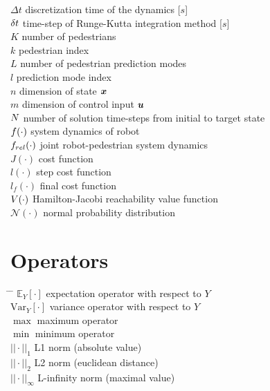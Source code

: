 \begin{tabbing}
$\Delta t$ \> discretization time of the dynamics [$s$] \\[0.5ex]
$\delta t$ \> time-step of Runge-Kutta integration method [$s$] \\[0.5ex]
$K$ \> number of pedestrians \\[0.5ex]
$k$ \> pedestrian index \\[0.5ex]
$L$ \> number of pedestrian prediction modes \\[0.5ex]
$l$ \> prediction mode index \\[0.5ex]
$n$ \> dimension of state $\boldsymbol{x}$ \\[0.5ex]
$m$ \> dimension of control input $\boldsymbol{u}$ \\[0.5ex]
$N$ \> number of solution time-steps from initial to target state \\[0.5ex]
$f(\cdot)$ \> system dynamics of robot \\[0.5ex]
$f_{rel}(\cdot)$ \> joint robot-pedestrian system dynamics \\[0.5ex]
$J(\cdot)$ \> cost function \\[0.5ex]
$l(\cdot)$ \> step cost function \\[0.5ex]
$l_f(\cdot)$ \> final cost function \\[0.5ex]
$V(\cdot)$ \> Hamilton-Jacobi reachability value function \\[0.5ex]
$\mathcal{N}(\cdot)$ \> normal probability distribution \\[0.5ex]
\end{tabbing}

\section*{Operators}
\begin{tabbing}
\hspace*{1.6cm} \= \hspace*{8cm} \= \kill
$\mathbb{E}_Y[\cdot]$ \> expectation operator with respect to $Y$ \\[0.5ex]
$\mathrm{Var}_Y[\cdot]$ \> variance operator with respect to $Y$ \\[0.5ex]
$\max$ \> maximum operator \\[0.5ex]
$\min$ \> minimum operator \\[0.5ex]
$||\cdot||_1$ \> L1 norm (absolute value) \\[0.5ex]
$||\cdot||_2$ \> L2 norm (euclidean distance) \\[0.5ex]
$||\cdot||_{\infty}$ \> L-infinity norm (maximal value) \\[0.5ex]
\end{tabbing}

